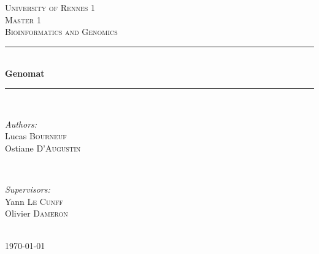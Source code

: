 \documentclass[]{report} %
\begin{document}
\begin{titlepage}
\newcommand{\HRule}{\rule{\linewidth}{0.5mm}}
\center
\textsc{\LARGE University of Rennes 1}\\[1.5cm]
\textsc{\large Master 1}\\[0.5cm] 
\textsc{\Large Bioinformatics and Genomics}\\[0.5cm] 


\HRule \\[0.4cm]
{ \huge \bfseries Genomat}\\[0.4cm] %
\HRule \\[1.5cm]
 

\begin{minipage}{0.4\textwidth}
\begin{flushleft} \large
\emph{Authors:}\\
Lucas \textsc{Bourneuf}\\
Ostiane	\textsc{D'Augustin}
\end{flushleft}
\end{minipage}
~
\begin{minipage}{0.4\textwidth}
\begin{flushright} \large
\emph{Supervisors:} \\
Yann \textsc{Le Cunff}\\
Olivier \textsc{Dameron}
\end{flushright}
\end{minipage}\\[2cm]


{\large \today}\\[1cm] %



\end{titlepage}
\end{document}
